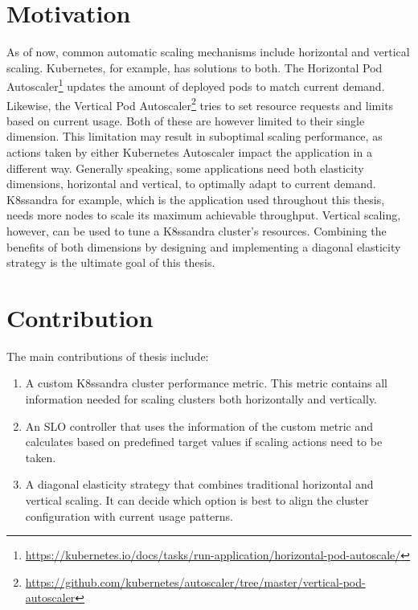 \section{Motivation}
\label{sec:motivation}

As of now, common automatic scaling mechanisms include horizontal and vertical scaling. Kubernetes, for example, has solutions to both. The Horizontal Pod Autoscaler\footnote{\raggedright\url{https://kubernetes.io/docs/tasks/run-application/horizontal-pod-autoscale/}} updates the amount of deployed pods to match current demand. Likewise, the Vertical Pod Autoscaler\footnote{\raggedright\url{https://github.com/kubernetes/autoscaler/tree/master/vertical-pod-autoscaler}} tries to set resource requests and limits based on current usage. Both of these are however limited to their single dimension. This limitation may result in suboptimal scaling performance, as actions taken by either Kubernetes Autoscaler impact the application in a different way. Generally speaking, some applications need both elasticity dimensions, horizontal and vertical, to optimally adapt to current demand. K8ssandra for example, which is the application used throughout this thesis, needs more nodes to scale its maximum achievable throughput. Vertical scaling, however, can be used to tune a K8ssandra cluster's resources. Combining the benefits of both dimensions by designing and implementing a diagonal elasticity strategy is the ultimate goal of this thesis.

\section{Contribution}
\label{sec:contribution}

The main contributions of thesis include:

\begin{enumerate}
    \item A custom K8ssandra cluster performance metric. This metric contains all information needed for scaling clusters both horizontally and vertically.

    \item An SLO controller that uses the information of the custom metric and calculates based on predefined target values if scaling actions need to be taken.

    \item A diagonal elasticity strategy that combines traditional horizontal and vertical scaling. It can decide which option is best to align the cluster configuration with current usage patterns.
\end{enumerate}

